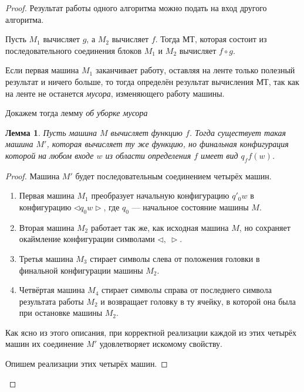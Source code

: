 \documentclass[a4paper, 12pt]{article}
\newtheorem*{fulllemma}{Лемма}
\begin{document}
\begin{proof}
    
    Результат работы одного алгоритма можно подать на вход другого алгоритма.

    Пусть $M_1$ вычисляет $g$, а $M_2$ вычисляет $f$. Тогда МТ, которая состоит из последовательного соединения блоков $M_1$ и $M_2$ вычисляет $f \circ g$.
    
    Если первая машина $M_1$ заканчивает работу, оставляя на ленте
    только полезный результат и ничего больше, то тогда определён результат вычисления МТ, так как на ленте не останется \textit{мусора}, изменяющего работу машины.
    
    Докажем тогда лемму \textit{об уборке мусора}
    \ 
    
    \begin{fulllemma}Пусть машина $M$ вычисляет функцию $f$. Тогда существует такая машина $M'$, которая вычисляет ту же функцию, но финальная конфигурация которой на любом входе $w$ из области определения $f$ имеет вид $q_f f(w)$.
    \end{fulllemma}
    
    \begin{proof}
        Машина $M'$ будет последовательным соединением четырёх машин.
        
        \begin{enumerate}
            \item Первая машина $M_1$ преобразует начальную конфигурацию $q'_0w$ в конфигурацию $\triangleleft q_0w \triangleright$, где $q_0$ — начальное состояние машины $M$.
            \item Вторая машина $M_2$ работает так же, как исходная машина $M$, но сохраняет окаймление конфигурации символами $\triangleleft,\ \triangleright$.
            \item Третья машина $M_3$ стирает символы слева от положения головки в финальной конфигурации машины $M_2$.
            \item Четвёртая машина $M_4$ стирает символы справа от последнего символа результата работы $M_2$ и возвращает головку в ту ячейку, в которой она была при остановке машины $M_2$.
        \end{enumerate}

        Как ясно из этого описания, при корректной реализации каждой из этих четырёх машин их соединение $M'$ удовлетворяет искомому свойству.

        Опишем реализации этих четырёх машин.
        

\end{proof}
\end{proof}
\end{document}
